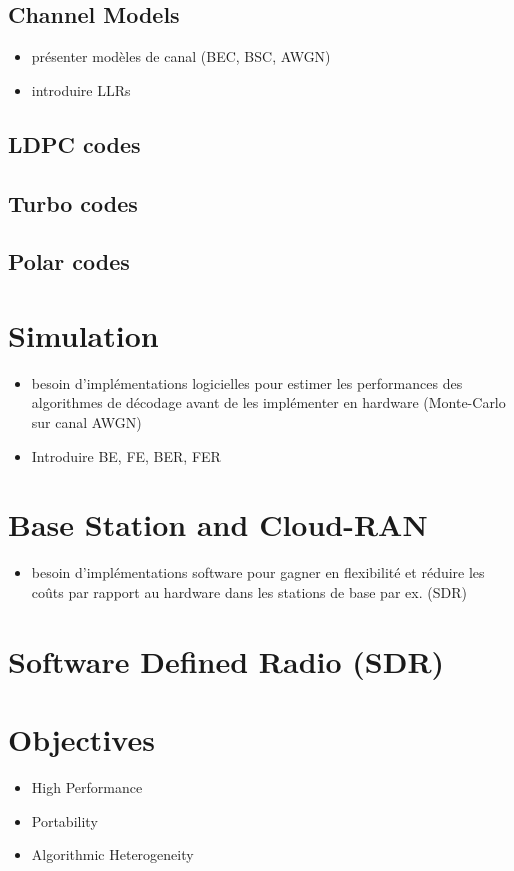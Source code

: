 \subsection{Channel Models}

\begin{itemize}
  \item présenter modèles de canal (BEC, BSC, AWGN)
  \item introduire LLRs
\end{itemize}

\subsection{LDPC codes}

\subsection{Turbo codes}

\subsection{Polar codes}

\section{Simulation}

\begin{itemize}
  \item besoin d'implémentations logicielles pour estimer les performances des
        algorithmes de décodage avant de les implémenter en hardware
        (Monte-Carlo sur canal AWGN)
  \item Introduire BE, FE, BER, FER
\end{itemize}

\section{Base Station and Cloud-RAN}

\begin{itemize}
  \item besoin d'implémentations software pour gagner en flexibilité et réduire
        les coûts par rapport au hardware dans les stations de base par ex.
        (SDR)
\end{itemize}

\section{Software Defined Radio (SDR)}

\section{Objectives}

\begin{itemize}
  \item High Performance
  \item Portability
  \item Algorithmic Heterogeneity
\end{itemize}
